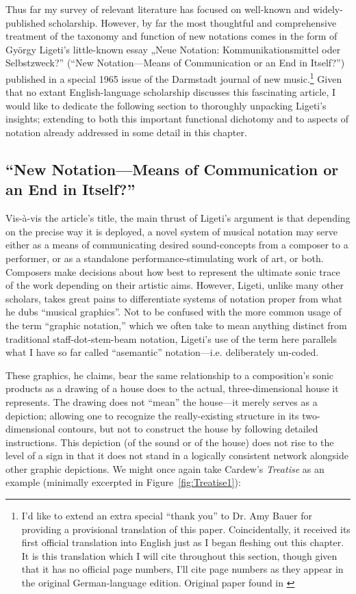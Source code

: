     Thus far my survey of relevant literature has focused on well-known and widely-published scholarship. However, by far the most thoughtful and comprehensive treatment of the taxonomy and function of new notations comes in the form of György Ligeti's little-known essay „Neue Notation: Kommunikationsmittel oder Selbstzweck?” (``New Notation---Means of Communication or an End in Itself?'') published in a special 1965 issue of the Darmstadt journal of new music.\footnote{I'd like to extend an extra special ``thank you'' to Dr. Amy Bauer for providing a provisional translation of this paper. Coincidentally, it received its first official translation into English just as I began fleshing out this chapter. It is this translation which I will cite throughout this section, though given that it has no official page numbers, I'll cite page numbers as they appear in the original German-language edition. Original paper found in \autocite{Ligeti_1965}} Given that no extant English-language scholarship discusses this fascinating article, I would like to dedicate the following section to thoroughly unpacking Ligeti's insights; extending to both this important functional dichotomy and to aspects of notation already addressed in some detail in this chapter.

    \subsection{``New Notation---Means of Communication or an End in Itself?''}

    Vis-à-vis the article's title, the main thrust of Ligeti's argument is that depending on the precise way it is deployed, a novel system of musical notation may serve either as a means of communicating desired sound-concepts from a composer to a performer, or as a standalone performance-stimulating work of art, or both. Composers make decisions about how best to represent the ultimate sonic trace of the work depending on their artistic aims. However, Ligeti, unlike many other scholars, takes great pains to differentiate systems of notation proper from what he dubs ``musical graphics''. Not to be confused with the more common usage of the term ``graphic notation,'' which we often take to mean anything distinct from traditional staff-dot-stem-beam notation, Ligeti's use of the term here parallels what I have so far called ``asemantic'' notation---i.e. deliberately un-coded.
    
    These graphics, he claims, bear the same relationship to a composition's sonic products as a drawing of a house does to the actual, three-dimensional house it represents. The drawing does not ``mean'' the house---it merely serves as a depiction; allowing one to recognize the really-existing structure in its two-dimensional contours, but not to construct the house by following detailed instructions.  This depiction (of the sound or of the house) does not rise to the level of a sign in that it does not stand in a logically consistent network alongside other graphic depictions. We might once again take Cardew's \textit{Treatise} as an example (minimally excerpted in Figure~\ref{fig:Treatise1}):

